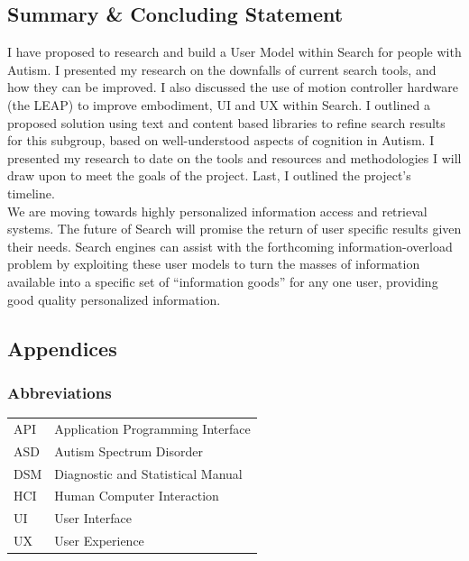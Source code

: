 \documentclass[10pt]{article}
\begin{document}
\subsection{Summary \& Concluding Statement}\label{future}
I have proposed to research and build a User Model within Search for people with Autism. I presented my research on the downfalls of current search tools, and how they can be improved. I also discussed the use of motion controller hardware (the LEAP) to improve embodiment, UI and UX within Search. I outlined a proposed solution using text and content based libraries to refine search results for this subgroup, based on well-understood aspects of cognition in Autism. I presented my research to date on the tools and resources and methodologies I will draw upon to meet the goals of the project. Last, I outlined the project's timeline.\\
We are moving towards highly personalized information access and retrieval systems. The future of Search will promise the return of user specific results given their needs. Search engines can assist with the forthcoming information-overload problem by exploiting these user models to turn the masses of information available into a specific set of “information goods” for any one user, providing good quality personalized information.

\subsection{Appendices}
\subsubsection{Abbreviations}
\begin{tabular}{l l }
API & Application Programming Interface\\
ASD & Autism Spectrum Disorder\\
DSM & Diagnostic and Statistical Manual\\
HCI & Human Computer Interaction\\
UI & User Interface\\
UX & User Experience\\
\end{tabular}
\end{document}
